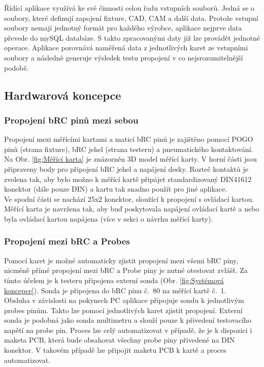     Řídící aplikace využívá ke své činnosti celou řadu vstupních souborů. Jedná se o soubory, které definují zapojení fixture, CAD, CAM a další data\cite{CAD_wiki}.
    Protože vstupní soubory nemají jednotný formát pro každého výrobce, aplikace nejprve data převede do mySQL databáze. S takto zpracovanými daty již lze
    provádět jednotné operace. Aplikace porovnává naměřená data z jednotlivých karet ze vstupními soubory a následně generuje výsledek testu propojení
    v co nejsrozumitelnější podobě.

    \subsection{Hardwarová koncepce}
    \subsubsection{Propojení bRC pinů mezi sebou}

    Propojení mezi měřícími kartami a maticí bRC pinů je zajištěno pomocí POGO pinů (strana fixture),
    bRC jehel (strana testeru) a pneumatického kontaktování.
    Na Obr. \ref{fig:Měřící karta} je znázorněn 3D model měřící karty. V horní části jsou připraveny 
    body pro připojení bRC jehel a napájení desky. Rozteč kontaktů je zvolena tak, aby bylo možno
    k měřící kartě připájet standardizovaný DIN41612 konektor (dále pouze DIN) a kartu tak snadno použít pro jiné aplikace.\\

    Ve spodní části se nachází 25x2 konektor, sloužící k propojení s ovládací kartou. Měřící karta je navržena tak, aby buď poskytovala
    napájení ovládací kartě a nebo byla ovládací kartou napájena (více v sekci o návrhu měřící karty).

    \subsubsection{Propojení mezi bRC a Probes}
    Pomocí karet je možné automaticky zjistit propojení mezi všemi bRC piny,
    nicméně přímé propojení mezi bRC a Probe piny je nutné otestovat zvlášť.
    Za tímto účelem je k testeru připojena externí sonda (Obr. \ref{fig:Systémová koncepce}).
    Sonda je připojena do bRC pinu \hbox{č. 80} na měřící
    kartě \hbox{č. 1.}\\

    Obsluha v závislosti na pokynech PC aplikace připojuje sondu k jednotlivým probes pinům.
    Takto lze pomocí jednotlivých karet zjistit propojení.
    Externí sonda je podobná jako sonda multimetru a slouží pouze k přivedení testovacího napětí na probe pin.
    Proces lze celý automatizovat v případě, že je k dispozici i maketa PCB,
    která bude obsahovat všechny probe piny přivedené na DIN konektor.
    V takovém případě lze připojit maketu PCB k kartě a proces automatizovat.


